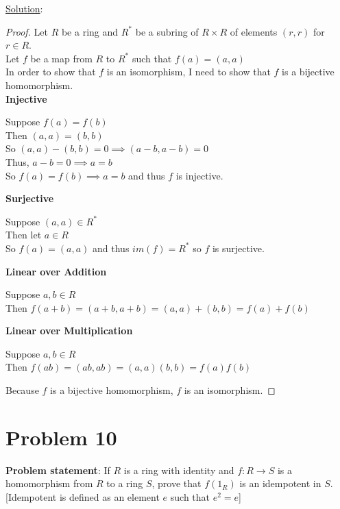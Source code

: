 \documentclass{article} %
\begin{document}
\underline{Solution}: 
\begin{addmargin}[1em]{0em}
\begin{proof} \hfill \break
Let $R$ be a ring and $R^*$ be a subring of $R \times R$ of elements $(r,r)$ for $r \in R$.
\\Let $f$ be a map from $R$ to $R^*$ such that $f(a) = (a,a)$
\\In order to show that $f$ is an isomorphism, I need to show that $f$ is a bijective homomorphism.
\\ \textbf{Injective}
\begin{addmargin}[1em]{0em}
Suppose $f(a) = f(b)$
\\Then $(a,a) = (b,b)$
\\So $(a,a) - (b,b) = 0 \implies (a-b,a-b) = 0$
\\Thus, $a-b = 0 \implies a = b$
\\So $f(a) = f(b) \implies a = b$ and thus $f$ is injective.
\end{addmargin}
\textbf{Surjective}
\begin{addmargin}[1em]{0em}
Suppose $(a,a) \in R^*$
\\Then let $a \in R$
\\So $f(a) = (a,a)$ and thus $im(f) = R^*$ so $f$ is surjective.
\end{addmargin}
\textbf{Linear over Addition}
\begin{addmargin}[1em]{0em}
Suppose $a, b \in R$
\\Then $f(a + b) = (a + b, a + b) = (a,a) + (b,b) = f(a) + f(b)$
\end{addmargin}
\textbf{Linear over Multiplication}
\begin{addmargin}[1em]{0em}
Suppose $a, b \in R$
\\Then $f(ab) = (ab, ab) = (a,a)(b,b) = f(a)f(b)$
\end{addmargin}
Because $f$ is a bijective homomorphism, $f$ is an isomorphism.
\end{proof}
\end{addmargin}

\newpage

\section*{Problem 10}

\textbf{Problem statement}: If $R$ is a ring with identity and $f:R \rightarrow S$ is a homomorphism from $R$ to a ring $S$, prove that $f(1_R)$ is an idempotent in $S$. [Idempotent is defined as an element $e$ such that $e^2 = e$]
\\
\end{document}
